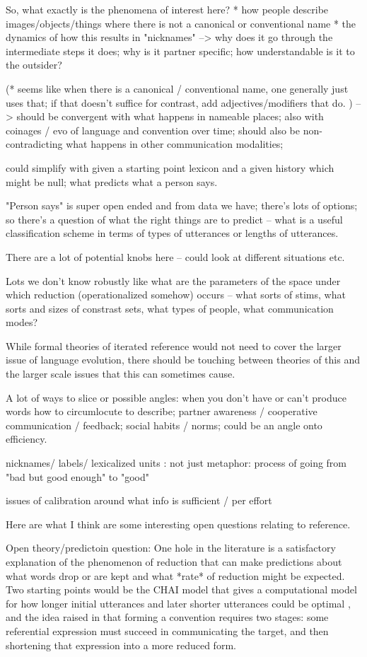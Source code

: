 \documentclass[]{article}
\begin{document}
	So, what exactly is the phenomena of interest here? 
	* how people describe images/objects/things where there is not a canonical or conventional name 
	* the dynamics of how this results in "nicknames" 
	--> why does it go through the intermediate steps it does; why is it partner specific; how understandable is it to the outsider? 
	
	(* seems like when there is a canonical / conventional name, one generally just uses that; if that doesn't suffice for contrast, add adjectives/modifiers that do. )
	-- > should be convergent with what happens in nameable places; also with coinages / evo of language and convention over time; should also be non-contradicting what happens in other communication modalities; 
	
	could simplify with given a starting point lexicon and a given history which might be null; what predicts what a person says. 
	
	"Person says" is super open ended and from data we have; there's lots of options; so there's a question of what the right things are to predict -- what is a useful classification scheme in terms of types of utterances or lengths of utterances. 
	
	There are a lot of potential knobs here -- could look at different situations etc. 
	
	Lots we don't know robustly like what are the parameters of the space under which reduction (operationalized somehow) occurs -- what sorts of stims, what sorts and sizes of constrast sets, what types of people, what communication modes? 
	
	While formal theories of iterated reference would not need to cover the larger issue of language evolution, there should be touching between theories of this and the larger scale issues that this can sometimes cause. 
	
	A lot of ways to slice or possible angles: when you don't have or can't produce words how to circumlocute to describe; partner awareness / cooperative communication / feedback; social habits / norms; could be an angle onto efficiency. 
	
	nicknames/ labels/ lexicalized units : not just metaphor: process of going from "bad but good enough" to "good"
	
	issues of calibration around what info is sufficient / per effort 
	
	Here are what I think are some interesting open questions relating to reference. 
	
	Open theory/predictoin question: One hole in the literature is a satisfactory explanation of the phenomenon of reduction that can make predictions about what words drop or are kept and what *rate* of reduction might be expected. Two starting points would be the CHAI model that gives a computational model for how longer initial utterances and later shorter utterances could be optimal \cite{hawkins2021}, and the idea raised in \cite{leung2023} that forming a convention requires two stages: some referential expression must succeed in communicating the target, and then shortening that expression into a more reduced form.
	
\end{document}
